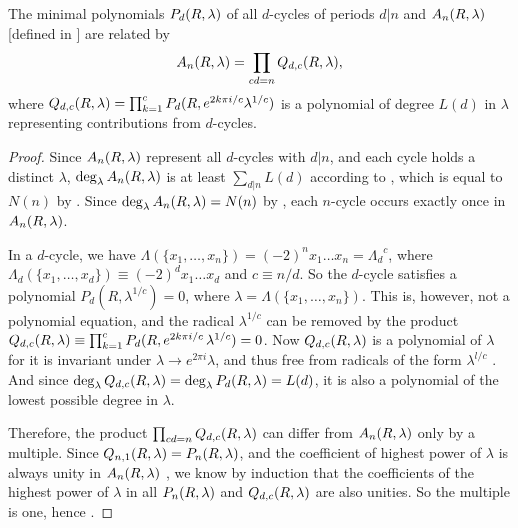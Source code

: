 \documentclass{ws-ijbc}
\begin{document}
\begin{theorem}
The minimal polynomials $P_d(R, \lambda)$ of all $d$-cycles
  of periods $d|n$
and $A_n(R, \lambda)$ [defined in ] are related by
  \begin{equation}
    A_n(R, \lambda) = \prod_{cd = n} Q_{d, c}(R, \lambda),
    \label{eq:prod}
  \end{equation}
  where
  $Q_{d,c}(R, \lambda) = \prod_{k=1}^{c} P_d(R, e^{2 k \pi i/c} \lambda^{1/c})$
  is a polynomial of degree $L(d)$ in $\lambda$
  representing contributions from $d$-cycles.
\label{thm:prod}
\end{theorem}

\begin{proof}
Since $A_n(R, \lambda)$ represent all $d$-cycles with $d|n$,
and each cycle holds a distinct $\lambda$,
  $\deg_\lambda A_n(R, \lambda)$
  is at least $\sum_{d|n} L(d)$
  according to ,
  which is equal to
  $N(n)$ by .
Since $\deg_\lambda A_n(R, \lambda) = N(n)$ by ,
  each $n$-cycle occurs exactly once in $A_n(R, \lambda)$.


In a $d$-cycle,
 we have $\Lambda(\{x_1, \ldots, x_n\}) = (-2)^n x_1 \dots x_n
   = {\Lambda_d}^c$,
where
$\Lambda_d(\{x_1, \ldots, x_d\}) \equiv (-2)^d x_1 \dots x_d$
and
$c \equiv n/d$.
So the $d$-cycle satisfies a polynomial
  $P_d(R, \lambda^{1/c}) = 0$,
where $\lambda = \Lambda(\{x_1,\ldots,x_n\})$.
%
This is, however, not a polynomial equation, and
%
the radical $\lambda^{1/c}$ can be removed by the product
$Q_{d,c}(R, \lambda)
  \equiv \prod_{k=1}^c P_d(R, e^{2k\pi i/c} \, \lambda^{1/c}) = 0$.
%
Now $Q_{d,c}(R, \lambda)$ is a polynomial of $\lambda$
  for it is invariant under
  $\lambda \rightarrow e^{2\pi i} \lambda$,
and thus free from radicals of the form $\lambda^{l/c}$
  \big[if $(l, c) \ne c$\big].
And since
  $\deg_\lambda Q_{d,c}(R, \lambda)
    = \deg_\lambda P_d(R, \lambda) = L(d)$,
  it is also a polynomial
  of the lowest possible degree in $\lambda$.


Therefore, the product $\prod_{cd=n} Q_{d,c}(R, \lambda)$
  can differ from $A_n(R, \lambda)$ only by
  a multiple.
Since $Q_{n,1}(R, \lambda) = P_n(R, \lambda)$,
  and the coefficient of highest power of $\lambda$ is always
  unity in $A_n(R, \lambda)$ ,
  we know by induction that the coefficients of the highest power of $\lambda$
  in all $P_n(R, \lambda)$ and $Q_{d,c}(R, \lambda)$
  are also unities.
So the multiple is one, hence .
%
%
%
\end{proof}
\end{document}
